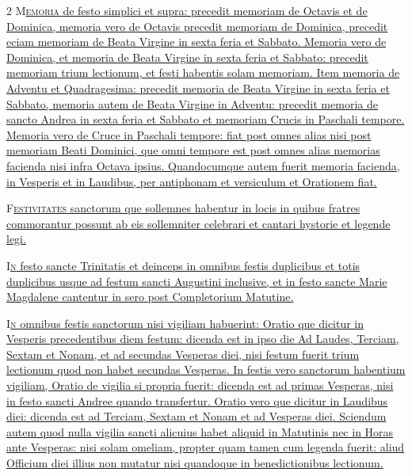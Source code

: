 \begin{multicols*}{2}
{\color{Red} }
\lettrine[lines=2]{\zallmancaps \color{Blue} M}{}\ul{\textsc{emoria} de festo simplici et supra: precedit memoriam de Octavis et de Dominica, memoria vero de Octavis precedit memoriam de Dominica, precedit eciam memoriam de Beata Virgine in sexta feria et Sabbato.
Memoria vero de Dominica, et memoria de Beata Virgine in sexta feria et Sabbato: precedit memoriam trium lectionum, et festi habentis solam memoriam. Item memoria de Adventu et Quadragesima: precedit memoria de Beata Virgine in sexta feria et Sabbato, memoria autem de Beata Virgine in Adventu: precedit memoria de sancto Andrea in sexta feria et Sabbato et memoriam Crucis in Paschali tempore. Memoria vero de Cruce in Paschali tempore: fiat post omnes alias nisi post memoriam Beati Dominici, que omni tempore est post omnes alias memorias facienda nisi infra Octava ipsius.
Quandocumque autem fuerit memoria facienda, in Vesperis et in Laudibus, per antiphonam et versiculum et Orationem fiat.}

{\color{Red} }
\lettrine[lines=2]{\zallmancaps \color{Red} F}{}\ul{\textsc{estivitates} sanctorum que sollemnes habentur in locis in quibus fratres commorantur possunt ab eis sollemniter celebrari et cantari hystorie et legende legi.}

{\color{Red} }
\lettrine[lines=2]{\zallmancaps \color{Blue} I}{}\ul{\textsc{n} festo sancte Trinitatis et deinceps in omnibus festis duplicibus et totis duplicibus usque ad festum sancti Augustini inclusive, et in festo sancte Marie Magdalene cantentur in sero post Completorium Matutine.}

{\color{Red} }
\lettrine[lines=2]{\zallmancaps \color{Blue} I}{}\ul{\textsc{n} omnibus festis sanctorum nisi vigiliam habuerint: Oratio que dicitur in Vesperis precedentibus diem festum: dicenda est in ipso die Ad Laudes, Terciam, Sextam et Nonam, et ad secundas Vesperas diei, nisi festum fuerit trium lectionum quod non habet secundas Vesperas.
In festis vero sanctorum habentium vigiliam, Oratio de vigilia si propria fuerit: dicenda est ad primas Vesperas, nisi in festo sancti Andree quando transfertur.
Oratio vero que dicitur in Laudibus diei: dicenda est ad Terciam, Sextam et Nonam et ad Vesperas diei. Sciendum autem quod nulla vigilia sancti alicuius habet aliquid in Matutinis nec in Horas ante Vesperas: nisi solam omeliam, propter quam tamen cum legenda fuerit: aliud Officium diei illius non mutatur nisi quandoque in benedictionibus lectionum.}


\end{multicols*}

